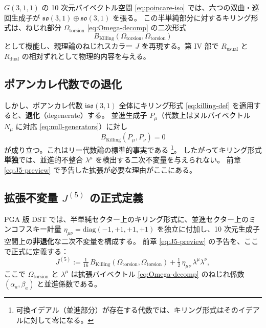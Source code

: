 \documentclass[dvipdfmx,a4paper,oneside]{jsbook}
\numberwithin{equation}{chapter}
\begin{document}
\(G(3,1,1)\) の 10 次元バイベクトル空間 \eqref{eq:poincare-iso} では、六つの双曲・巡回生成子が \(\mathfrak{so}(3,1) \oplus \mathfrak{so}(3,1)\) を張る。
この半単純部分に対するキリング形式は、ねじれ部分 \(\Omega_{\mathrm{torsion}}\) \eqref{eq:Omega-decomp} の二次形式
\begin{equation}
  B_{\mathrm{Killing}}(\Omega_{\mathrm{torsion}}, \Omega_{\mathrm{torsion}})
  \label{eq:killing-torsion}
\end{equation}
として機能し、親理論のねじれスカラー \(J\) を再現する。第 IV 部で \(R_{\mathrm{usual}}\) と \(R_{\mathrm{dual}}\) の相対ずれとして物理的内容を与える。

\subsection{ポアンカレ代数での退化}

しかし、ポアンカレ代数 \(\mathfrak{iso}(3,1)\) 全体にキリング形式 \eqref{eq:killing-def} を適用すると、\textbf{退化}（degenerate）する。
並進生成子 \(P_\mu\)（代数上はヌルバイベクトル \(N_\mu\) に対応 \eqref{eq:null-generators}）に対し
\begin{equation}
  B_{\mathrm{Killing}}(P_\mu, P_\nu) = 0
  \label{eq:killing-degeneracy}
\end{equation}
が成り立つ。これはリー代数論の標準的事実である \footnote{可換イデアル（並進部分）が存在する代数では、キリング形式はそのイデアルに対して零になる。}。
したがってキリング形式\textbf{単独}では、並進的不整合 \(\lambda^\mu\) を検出する二次不変量を与えられない。
前章 \eqref{eq:J5-preview} で予告した拡張が必要な理由がここにある。

\subsection{拡張不変量 \(J^{(5)}\) の正式定義}

PGA 版 DST では、半単純セクター上のキリング形式に、並進セクター上のミンコフスキー計量 \(\eta_{\mu\nu} = \mathrm{diag}(-1,+1,+1,+1)\) を独立に付加し、10 次元生成子空間上の\textbf{非退化}な二次不変量を構成する。
前章 \eqref{eq:J5-preview} の予告を、ここで正式に定義する：
\begin{equation}
  \boxed{\;
  J^{(5)}
  := \tfrac{1}{16}\, B_{\mathrm{Killing}}(\Omega_{\mathrm{torsion}}, \Omega_{\mathrm{torsion}})
  + \tfrac{1}{2}\, \eta_{\mu\nu}\, \lambda^\mu \lambda^\nu,
  \;}
  \label{eq:J5-invariant}
\end{equation}
ここで \(\Omega_{\mathrm{torsion}}\) と \(\lambda^\mu\) は拡張バイベクトル \eqref{eq:Omega-decomp} のねじれ係数 \((\alpha_a, \beta_a)\) と並進係数である。
\end{document}
